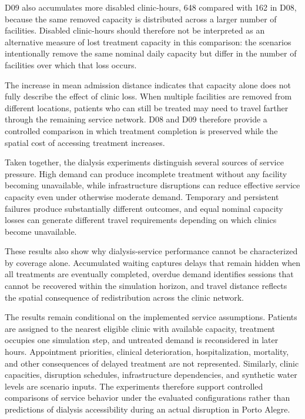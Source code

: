 D09 also accumulates more disabled clinic-hours, 648 compared with 162 in D08, because the same removed capacity is distributed across a larger number of facilities. Disabled clinic-hours should therefore not be interpreted as an alternative measure of lost treatment capacity in this comparison: the scenarios intentionally remove the same nominal daily capacity but differ in the number of facilities over which that loss occurs.

The increase in mean admission distance indicates that capacity alone does not fully describe the effect of clinic loss. When multiple facilities are removed from different locations, patients who can still be treated may need to travel farther through the remaining service network. D08 and D09 therefore provide a controlled comparison in which treatment completion is preserved while the spatial cost of accessing treatment increases.


Taken together, the dialysis experiments distinguish several sources of service pressure. High demand can produce incomplete treatment without any facility becoming unavailable, while infrastructure disruptions can reduce effective service capacity even under otherwise moderate demand. Temporary and persistent failures produce substantially different outcomes, and equal nominal capacity losses can generate different travel requirements depending on which clinics become unavailable.

These results also show why dialysis-service performance cannot be characterized by coverage alone. Accumulated waiting captures delays that remain hidden when all treatments are eventually completed, overdue demand identifies sessions that cannot be recovered within the simulation horizon, and travel distance reflects the spatial consequence of redistribution across the clinic network.

The results remain conditional on the implemented service assumptions. Patients are assigned to the nearest eligible clinic with available capacity, treatment occupies one simulation step, and untreated demand is reconsidered in later hours. Appointment priorities, clinical deterioration, hospitalization, mortality, and other consequences of delayed treatment are not represented. Similarly, clinic capacities, disruption schedules, infrastructure dependencies, and synthetic water levels are scenario inputs. The experiments therefore support controlled comparisons of service behavior under the evaluated configurations rather than predictions of dialysis accessibility during an actual disruption in Porto Alegre.

